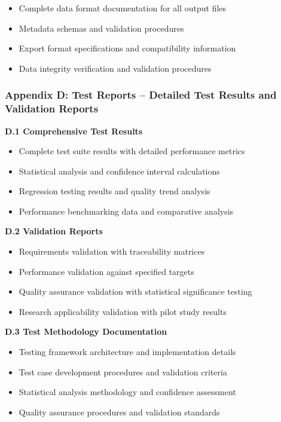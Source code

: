 \documentclass[12pt,a4paper]{report}
\begin{document}
\begin{itemize}
\item Complete data format documentation for all output files
\item Metadata schemas and validation procedures
\item Export format specifications and compatibility information
\item Data integrity verification and validation procedures

\end{itemize}
\subsubsection{Appendix D: Test Reports – Detailed Test Results and Validation Reports}

\textbf{D.1 Comprehensive Test Results}

\begin{itemize}
\item Complete test suite results with detailed performance metrics
\item Statistical analysis and confidence interval calculations
\item Regression testing results and quality trend analysis
\item Performance benchmarking data and comparative analysis

\end{itemize}
\textbf{D.2 Validation Reports}

\begin{itemize}
\item Requirements validation with traceability matrices
\item Performance validation against specified targets
\item Quality assurance validation with statistical significance testing
\item Research applicability validation with pilot study results

\end{itemize}
\textbf{D.3 Test Methodology Documentation}

\begin{itemize}
\item Testing framework architecture and implementation details
\item Test case development procedures and validation criteria
\item Statistical analysis methodology and confidence assessment
\item Quality assurance procedures and validation standards

\end{itemize}
\end{document}
